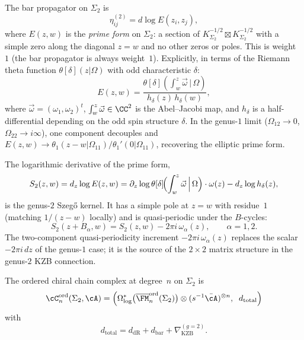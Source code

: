 The bar propagator on $\Sigma_2$ is
\begin{equation}\label{eq:bar-prop-g2}
  \eta^{(2)}_{ij}
  = d\log E(z_i, z_j),
\end{equation}
where $E(z,w)$ is the \emph{prime form} on $\Sigma_2$:
a section of $K_{\Sigma_2}^{-1/2} \boxtimes
K_{\Sigma_2}^{-1/2}$ with a simple zero along the
diagonal $z = w$ and no other zeros or poles.
This is weight~$1$ (the bar propagator is always weight~$1$).
Explicitly, in terms of the Riemann theta function
$\theta[\delta](z|\Omega)$ with odd characteristic
$\delta$:
\begin{equation}\label{eq:prime-form-g2}
  E(z, w)
  = \frac{\theta[\delta]\!\left(
  \int_w^z \vec{\omega}\,\big|\,\Omega\right)}
  {h_\delta(z)\,h_\delta(w)},
\end{equation}
where $\vec{\omega} = (\omega_1, \omega_2)^t$,
$\int_w^z \vec{\omega} \in \CC^2$ is the Abel--Jacobi
map, and $h_\delta$ is a half-differential depending on the
odd spin structure $\delta$.
In the genus-$1$ limit
($\Omega_{12} \to 0$, $\Omega_{22} \to i\infty$), one
component decouples and
$E(z,w) \to \theta_1(z - w|\Omega_{11})/\theta_1'(0|\Omega_{11})$,
recovering the elliptic prime form.

\begin{remark}
\label{rem:szego-g2}
The logarithmic derivative of the prime form,
\begin{equation}\label{eq:szego-g2}
  S_2(z, w)
  = d_z \log E(z, w)
  = \partial_z \log \theta[\delta]\!\Bigl(
  \int_w^z \vec{\omega}\,\Big|\,\Omega\Bigr)
  \cdot \omega(z)
  - d_z \log h_\delta(z),
\end{equation}
is the genus-$2$ Szeg\H{o} kernel. It has a simple pole
at $z = w$ with residue~$1$ (matching $1/(z-w)$ locally)
and is quasi-periodic under the $B$-cycles:
\begin{equation}\label{eq:szego-quasiperiod}
  S_2(z + B_\alpha, w)
  = S_2(z, w)
  - 2\pi i\,\omega_\alpha(z),
  \qquad \alpha = 1, 2.
\end{equation}
The two-component quasi-periodicity
increment $-2\pi i\,\omega_\alpha(z)$ replaces the scalar
$-2\pi i\,dz$ of the genus-$1$ case; it is the source of
the $2 \times 2$ matrix structure in the genus-$2$ KZB
connection.
\end{remark}

The ordered chiral chain complex at degree~$n$ on
$\Sigma_2$ is
\begin{equation}\label{eq:g2-chiral-cx}
  \cC_n^{\mathrm{ord}}(\Sigma_2, \cA)
  = \Bigl(
  \Omega^*_{\log}\bigl(
  \overline{\FM}_n^{\mathrm{ord}}(\Sigma_2)\bigr)
  \otimes (s^{-1}\bar{\cA})^{\otimes n},
  \;\; d_{\mathrm{total}}
  \Bigr)
\end{equation}
with
\begin{equation}\label{eq:d-total-g2}
  d_{\mathrm{total}}
  = d_{\mathrm{dR}}
  + d_{\mathrm{bar}}
  + \nabla_{\mathrm{KZB}}^{(g=2)}.
\end{equation}

